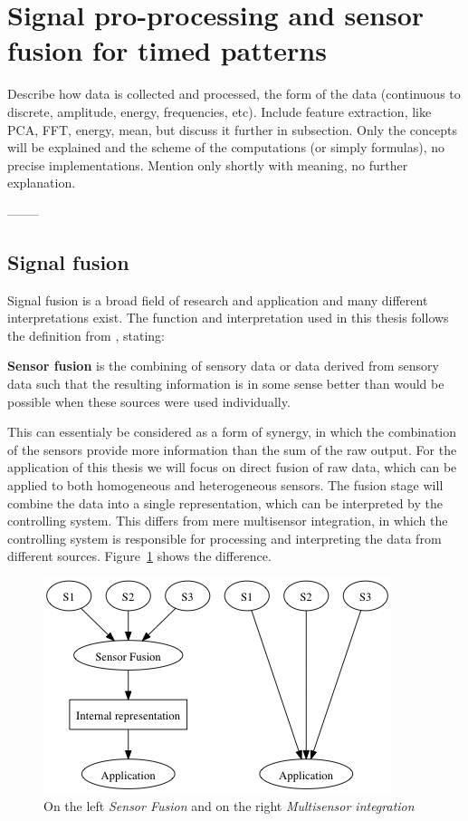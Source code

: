 
\section{Signal pro-processing and sensor fusion for timed patterns}
  Describe how data is collected and processed, the form of the data (continuous to discrete, amplitude, energy, frequencies, etc).
  Include feature extraction, like PCA, FFT, energy, mean, but discuss it further in subsection.
  Only the concepts will be explained and the scheme of the computations (or simply formulas), no precise implementations.
  Mention only shortly with meaning, no further explanation.

  --------


    \subsection{Signal fusion}
    Signal fusion is a broad field of research and application and many different interpretations exist.
    The function and interpretation used in this thesis follows the definition from \cite{elmenreich2001introduction}, stating:
    \begin{center}
      \textbf{Sensor fusion} is the combining of sensory data or data derived from sensory data such that the resulting information is in some sense better than would be possible when these sources were used individually.
    \end{center}
    This can essentialy be considered as a form of synergy, in which the combination of the sensors provide more information than the sum of the raw output.
    For the application of this thesis we will focus on direct fusion of raw data, which can be applied to both homogeneous and heterogeneous sensors.
    The fusion stage will combine the data into a single representation, which can be interpreted by the controlling system.
    This differs from mere multisensor integration, in which the controlling system is responsible for processing and interpreting the data from different sources.
    Figure~\ref{fig:sensor_fusion} shows the difference.

    \begin{figure}[htbp]
      \centering
        \includegraphics{./Figures/sensor_fusion.png}
      \caption[K-means]{On the left \emph{Sensor Fusion} and on the right \emph{Multisensor integration}}
      \label{fig:sensor_fusion}
    \end{figure}

